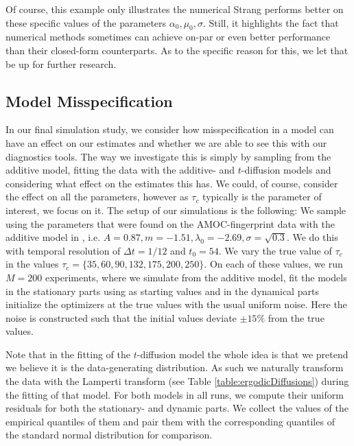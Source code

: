 Of course, this example only illustrates the numerical Strang performs better on these specific values of the parameters $\alpha_0, \mu_0, \sigma$. Still, it highlights the fact that numerical methods sometimes can achieve on-par or even better performance than their closed-form counterparts. As to the specific reason for this, we let that be up for further research.
\subsection{Model Misspecification}
In our final simulation study, we consider how misspecification in a model can have an effect on our estimates and whether we are able to see this with our diagnostics tools. The way we investigate this is simply by sampling from the additive model, fitting the data with the additive- and $t$-diffusion models and considering what effect on the estimates this has. We could, of course, consider the effect on all the parameters, however as $\tau_c$ typically is the parameter of interest, we focus on it. The setup of our simulations is the following: We sample using the parameters that were found on the AMOC-fingerprint data with the additive model in \cite[Figure 6]{Ditlevsen2023}, i.e. $A = 0.87, m = -1.51, \lambda_0 = -2.69, \sigma = \sqrt{0.3}$. We do this with temporal resolution of $\Delta t = 1/12$ and $t_0 =54$. We vary the true value of $\tau_c$ in the values $\tau_c = \{35, 60, 90, 132, 175, 200, 250\}$. On each of these values, we run $M = 200$ experiments, where we simulate from the additive model, fit the models in the stationary parts using \cite[equation (S4-S6)]{DitlevsenSupplementary} as starting values and in the dynamical parts initialize the optimizers at the true values with the usual uniform noise. Here the noise is constructed such that the initial values deviate $\pm 15\%$ from the true values.

Note that in the fitting of the $t$-diffusion model the whole idea is that we pretend we believe it is the data-generating distribution. As such we naturally transform the data with the Lamperti transform (see Table \ref{table:ergodicDiffusions}) during the fitting of that model. For both models in all runs, we compute their uniform residuals for both the stationary- and dynamic parts. We collect the values of the empirical quantiles of them and pair them with the corresponding quantiles of the standard normal distribution for comparison.

